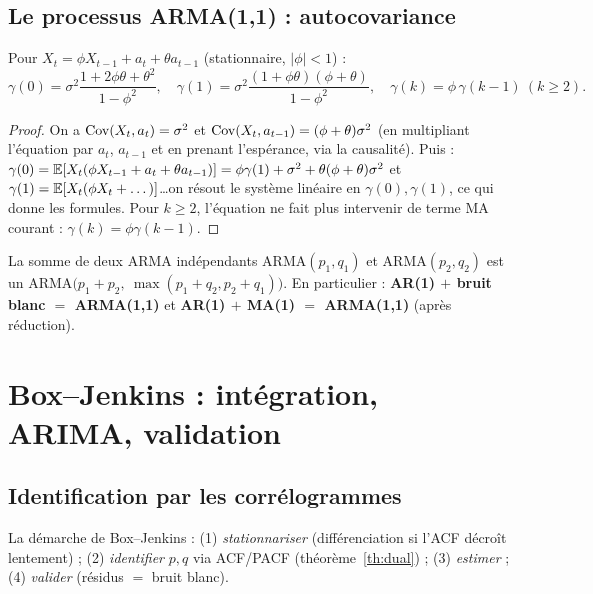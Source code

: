 \documentclass[11pt]{report}
\begin{document}
\section{Le processus ARMA(1,1) : autocovariance}
\begin{theoreme}\label{th:arma11}
Pour $X_t=\phi X_{t-1}+a_t+\theta a_{t-1}$ (stationnaire, $|\phi|<1$) :
\[
\gamma(0)=\sigma^2\frac{1+2\phi\theta+\theta^2}{1-\phi^2},\quad
\gamma(1)=\sigma^2\frac{(1+\phi\theta)(\phi+\theta)}{1-\phi^2},\quad
\gamma(k)=\phi\,\gamma(k-1)\ (k\ge2).
\]
\end{theoreme}
\begin{proof}
On a $\operatorname{Cov}(X_t,a_t)=\sigma^2$ et $\operatorname{Cov}(X_t,a_{t-1})=(\phi+\theta)\sigma^2$ (en multipliant
l'équation par $a_t$, $a_{t-1}$ et en prenant l'espérance, via la causalité). Puis :
$\gamma(0)=\mathbb{E}[X_t(\phi X_{t-1}+a_t+\theta a_{t-1})]
=\phi\gamma(1)+\sigma^2+\theta(\phi+\theta)\sigma^2$ et
$\gamma(1)=\mathbb{E}[X_t(\phi X_t+\dots)]$\dots on résout le système linéaire en $\gamma(0),\gamma(1)$,
ce qui donne les formules. Pour $k\ge2$, l'équation ne fait plus intervenir de terme MA
courant : $\gamma(k)=\phi\gamma(k-1)$.
\end{proof}
\begin{proposition}
La somme de deux ARMA indépendants ARMA$(p_1,q_1)$ et ARMA$(p_2,q_2)$ est un
ARMA$\big(p_1+p_2,\ \max(p_1+q_2,p_2+q_1)\big)$. En particulier :
\textbf{AR(1) $+$ bruit blanc $=$ ARMA(1,1)} et \textbf{AR(1) $+$ MA(1) $=$ ARMA(1,1)} (après
réduction).
\end{proposition}

\chapter{Box--Jenkins : intégration, ARIMA, validation}

\section{Identification par les corrélogrammes}
La démarche de Box--Jenkins : (1) \emph{stationnariser} (différenciation si l'ACF décroît
lentement) ; (2) \emph{identifier} $p,q$ via ACF/PACF (théorème~\ref{th:dual}) ;
(3) \emph{estimer} ; (4) \emph{valider} (résidus $=$ bruit blanc).
\end{document}
